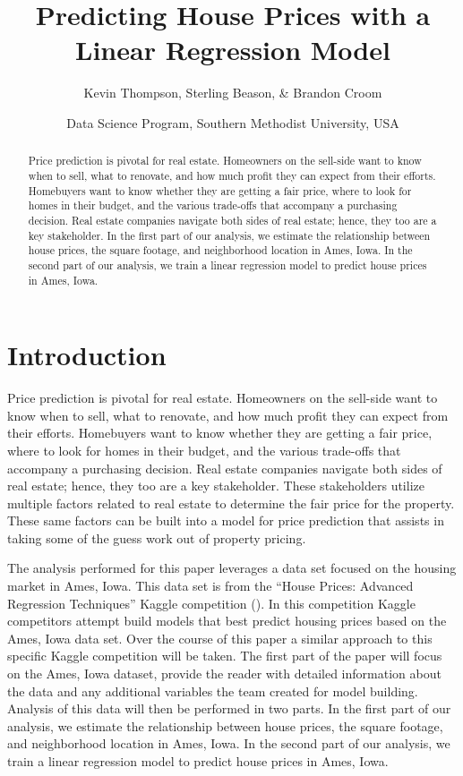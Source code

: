 \documentclass[american,]{article}
\title{Predicting House Prices with a Linear Regression Model}
\author{Kevin Thompson, Sterling Beason, \& Brandon Croom}
\date{Data Science Program, Southern Methodist University, USA \break}
\begin{document}
\maketitle
\begin{abstract}
Price prediction is pivotal for real estate. Homeowners on the sell-side
want to know when to sell, what to renovate, and how much profit they
can expect from their efforts. Homebuyers want to know whether they are
getting a fair price, where to look for homes in their budget, and the
various trade-offs that accompany a purchasing decision. Real estate
companies navigate both sides of real estate; hence, they too are a key
stakeholder. In the first part of our analysis, we estimate the
relationship between house prices, the square footage, and neighborhood
location in Ames, Iowa. In the second part of our analysis, we train a
linear regression model to predict house prices in Ames, Iowa.
\end{abstract}

\section{Introduction}\label{introduction}

Price prediction is pivotal for real estate. Homeowners on the sell-side
want to know when to sell, what to renovate, and how much profit they
can expect from their efforts. Homebuyers want to know whether they are
getting a fair price, where to look for homes in their budget, and the
various trade-offs that accompany a purchasing decision. Real estate
companies navigate both sides of real estate; hence, they too are a key
stakeholder. These stakeholders utilize multiple factors related to real
estate to determine the fair price for the property. These same factors
can be built into a model for price prediction that assists in taking
some of the guess work out of property pricing.

The analysis performed for this paper leverages a data set focused on
the housing market in Ames, Iowa. This data set is from the ``House
Prices: Advanced Regression Techniques'' Kaggle competition
(\citet{Kaggle2016}). In this competition Kaggle competitors attempt
build models that best predict housing prices based on the Ames, Iowa
data set. Over the course of this paper a similar approach to this
specific Kaggle competition will be taken. The first part of the paper
will focus on the Ames, Iowa dataset, provide the reader with detailed
information about the data and any additional variables the team created
for model building. Analysis of this data will then be performed in two
parts. In the first part of our analysis, we estimate the relationship
between house prices, the square footage, and neighborhood location in
Ames, Iowa. In the second part of our analysis, we train a linear
regression model to predict house prices in Ames, Iowa.
\end{document}
